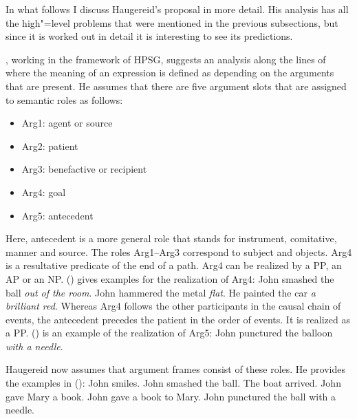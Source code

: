 \begin{exe}
\begin{xlist}[iv.]
\begin{exe}
\begin{xlist}[iv.]

In what follows I discuss Haugereid's proposal \citeyearpar{Haugereid2007a} in more detail. His analysis has all the
high"=level problems that were mentioned in the previous subsections, but since it is worked out in
detail it is interesting to see its predictions.

\mbox{}\citet{Haugereid2007a}, working in the framework of HPSG, suggests an analysis along the lines of \citet{Borer2005a-u} where the meaning of an expression is defined as depending
on the arguments that are present. He assumes that there are five argument slots that are assigned to semantic roles
as follows:
\begin{itemize}
\item Arg1: agent or source
\item Arg2: patient
\item Arg3: benefactive or recipient
\item Arg4: goal
\item Arg5: antecedent
\end{itemize}
Here, antecedent is a more general role that stands for instrument, comitative, manner and source.
The roles Arg1--Arg3 correspond to subject and objects. Arg4 is a resultative predicate of the end of a path.
Arg4 can be realized by a PP, an AP or an NP. ()
gives examples for the realization of Arg4:
\eal
\ex John smashed the ball \emph{out of the room}.
\ex John hammered the metal \emph{flat}.
\ex He painted the car \emph{a brilliant red}.
\zl
Whereas Arg4 follows the other participants in the causal chain of events, the antecedent precedes the patient in the order of
events. It is realized as a PP.
() is an example of the realization of Arg5:
\ea
John punctured the balloon \emph{with a needle}.
\z

\noindent
Haugereid now assumes that argument frames consist of these roles. He provides the examples in 
():
\eal
\settowidth{}
\ex John smiles.           
\ex John smashed the ball. 
\ex The boat arrived.      
\ex John gave Mary a book. 
\ex John gave a book to Mary. 
\ex John punctured the ball with a needle. 
\zl


\end{xlist}
\end{exe}
\end{xlist}
\end{exe}
